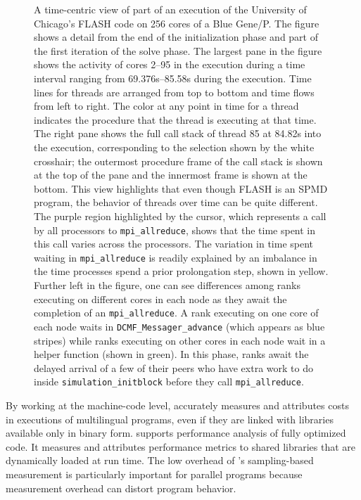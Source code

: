 \documentclass[11pt,twoside,letterpaper]{report}
\begin{document}
\begin{figure}[t]
\caption{A time-centric view of  part of an execution of the University of Chicago's FLASH code  on 256 cores of a Blue Gene/P. The figure shows a detail from the end of the initialization phase and  part of the first iteration of the solve phase. The largest pane in the figure shows the activity of cores 2--95 in the execution during a time interval ranging from 69.376s--85.58s during the execution.  Time lines for threads are arranged from top to bottom and time flows from left to right. The color at any point in time for a thread indicates the procedure that the thread is executing at that time. The right pane shows the full call stack of thread 85 at 84.82s into the execution, corresponding to the selection shown by the white crosshair; the outermost procedure frame of the call stack is shown at the top of the pane and the innermost frame is shown at the bottom. This view highlights that even though FLASH is an SPMD program, the behavior of threads over time can be quite different. The purple region highlighted by the cursor, which represents a call by all processors to {\tt mpi\_allreduce}, shows that the time spent in this call varies across the processors. The variation in time spent waiting in {\tt mpi\_allreduce} is readily explained by an imbalance in the time processes spend a prior prolongation step, shown in yellow. Further left in the figure, one can see differences among ranks executing on different cores in each node as they await the  completion of an {\tt mpi\_allreduce}. A rank executing on one core of each node waits in {\tt DCMF\_Messager\_advance} (which appears as blue stripes) while ranks executing on other cores in each node wait in a helper function (shown in green). In this phase, ranks await the delayed arrival of a few of their peers who have extra work to do inside {\tt simulation\_initblock} before they call  {\tt mpi\_allreduce}. }
\label{fig:time-centric}
\end{figure}





By working at the machine-code level, \HPCToolkit{} accurately measures and attributes costs in executions of multilingual programs, even if they are linked with libraries available only in binary form.
\HPCToolkit{} supports performance analysis of fully optimized code.
It measures and attributes performance metrics to shared libraries that are dynamically loaded at run time.
The low overhead of \HPCToolkit{}'s sampling-based measurement is particularly important
for parallel programs because measurement overhead can distort program behavior.
\end{document}
